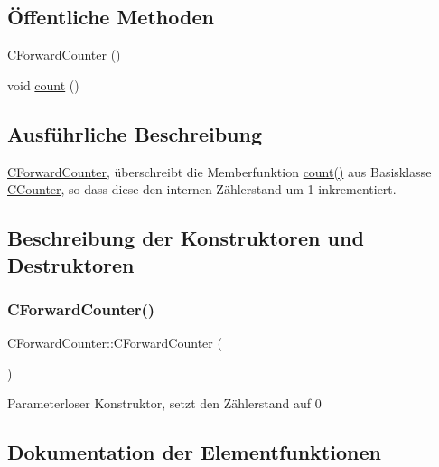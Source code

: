 \subsection*{Öffentliche Methoden}
\begin{DoxyCompactItemize}
\item 
\hyperlink{class_c_forward_counter_aeda1b05d715820f61e377a2c6fa52b2e}{C\+Forward\+Counter} ()
\item 
void \hyperlink{class_c_forward_counter_afc451afa9f8b76f70b28c08982265a86}{count} ()
\end{DoxyCompactItemize}


\subsection{Ausführliche Beschreibung}
\hyperlink{class_c_forward_counter}{C\+Forward\+Counter}, überschreibt die Memberfunktion \hyperlink{class_c_forward_counter_afc451afa9f8b76f70b28c08982265a86}{count()} aus Basisklasse \hyperlink{class_c_counter}{C\+Counter}, so dass diese den internen Zählerstand um 1 inkrementiert. 

\subsection{Beschreibung der Konstruktoren und Destruktoren}
\mbox{\label{class_c_forward_counter_aeda1b05d715820f61e377a2c6fa52b2e}} 
\subsubsection{\texorpdfstring{C\+Forward\+Counter()}{CForwardCounter()}}
{\footnotesize\ttfamily C\+Forward\+Counter\+::\+C\+Forward\+Counter (\begin{DoxyParamCaption}{ }\end{DoxyParamCaption})}

Parameterloser Konstruktor, setzt den Zählerstand auf 0 

\subsection{Dokumentation der Elementfunktionen}
\mbox{\label{class_c_forward_counter_afc451afa9f8b76f70b28c08982265a86}} 
